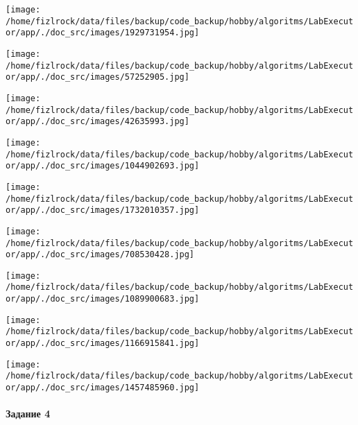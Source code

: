\documentclass[a4paper, 12pt]{article}
\begin{document}
\texttt{[image: /home/fizlrock/data/files/backup/code\_backup/hobby/algoritms/LabExecutor/app/./doc\_src/images/1929731954.jpg]}

\texttt{[image: /home/fizlrock/data/files/backup/code\_backup/hobby/algoritms/LabExecutor/app/./doc\_src/images/57252905.jpg]}

\texttt{[image: /home/fizlrock/data/files/backup/code\_backup/hobby/algoritms/LabExecutor/app/./doc\_src/images/42635993.jpg]}

\texttt{[image: /home/fizlrock/data/files/backup/code\_backup/hobby/algoritms/LabExecutor/app/./doc\_src/images/1044902693.jpg]}

\texttt{[image: /home/fizlrock/data/files/backup/code\_backup/hobby/algoritms/LabExecutor/app/./doc\_src/images/1732010357.jpg]}

\texttt{[image: /home/fizlrock/data/files/backup/code\_backup/hobby/algoritms/LabExecutor/app/./doc\_src/images/708530428.jpg]}

\texttt{[image: /home/fizlrock/data/files/backup/code\_backup/hobby/algoritms/LabExecutor/app/./doc\_src/images/1089900683.jpg]}

\texttt{[image: /home/fizlrock/data/files/backup/code\_backup/hobby/algoritms/LabExecutor/app/./doc\_src/images/1166915841.jpg]}

\texttt{[image: /home/fizlrock/data/files/backup/code\_backup/hobby/algoritms/LabExecutor/app/./doc\_src/images/1457485960.jpg]}
\pagebreak
\paragraph{Задание 4}
\end{document}
